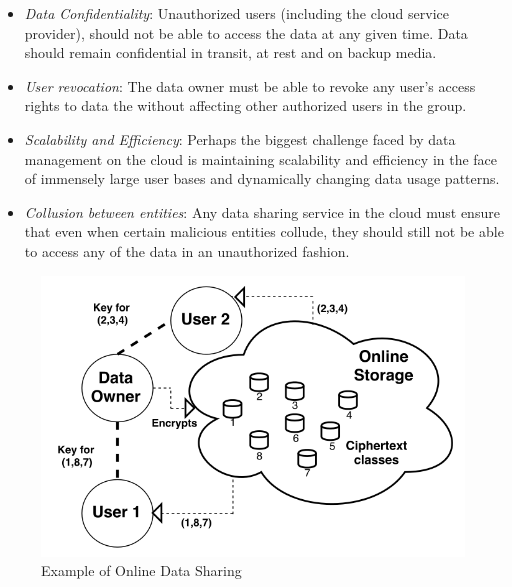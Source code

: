 \begin{itemize}
 \item \emph{Data Confidentiality}: Unauthorized users (including the cloud service provider), should not be able to access the data at any given time. Data should remain confidential in transit, at rest and on backup media.
 
 \item \emph{User revocation}: The data owner must be able to revoke any user's access rights to data the without affecting other authorized users in the group. 
 
 \item \emph{Scalability and Efficiency}: Perhaps the biggest challenge faced by data management on the cloud is maintaining scalability and efficiency in the face of immensely large user bases and dynamically changing data usage patterns.
 
 \item \emph{Collusion between entities}: Any data sharing service in the cloud must ensure that even when certain malicious entities collude, they should still not be able to access any of the data in an unauthorized fashion. 

\end{itemize}

 
\begin{figure}
\centering
\captionsetup{font=scriptsize}
\includegraphics[scale=0.4]{Figs/KeyAgg.png}
\caption{Example of Online Data Sharing}
\label{fig:intro}
\end{figure}

